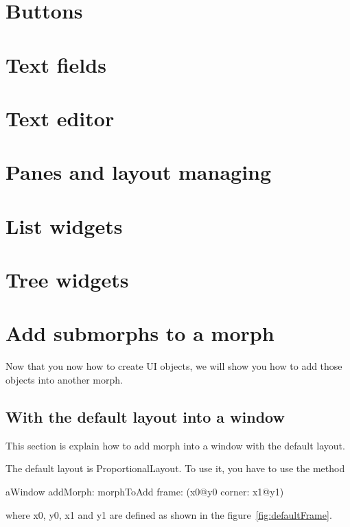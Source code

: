 \documentclass[a4paper,10pt,twoside]{book}
\begin{document}
\section{Buttons}

\section{Text fields}

\section{Text editor}

\section{Panes and layout managing}

\section{List widgets}

\section{Tree widgets}

\section{Add submorphs to a morph}


Now that you now how to create UI objects, we will show you how to add those objects into another morph.

\subsection{With the default layout into a window}

This section is explain how to add morph into a window with the default layout.

The default layout is ProportionalLayout. To use it, you have to use the method 
\begin{code}{}
aWindow
	addMorph: morphToAdd
	frame: (x0@y0 corner: x1@y1)
\end{code}
where x0, y0, x1 and y1 are defined as shown in the figure~\ref{fig:defaultFrame}.
\end{document}
